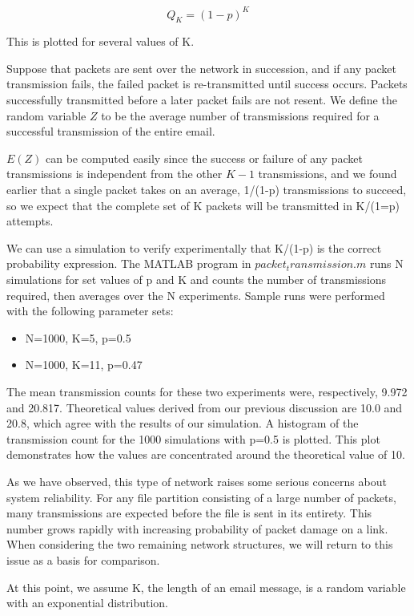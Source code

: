 \documentclass[10pt,twocolumn,letterpaper]{article}
\begin{document}
$$ Q_K = (1-p)^K $$

This is plotted for several values of K.

Suppose that packets are sent over the network in succession, and if any packet transmission fails, the failed packet is re-transmitted until success occurs. Packets successfully transmitted before a later packet fails are not resent. We define the random variable $Z$ to be the average number of transmissions required for a successful transmission of the entire email. 

$E(Z)$ can be computed easily since the success or failure of any packet transmissions is independent from the other $K-1$ transmissions, and we found earlier that a single packet takes on an average, 1/(1-p) transmissions to succeed, so we expect that the complete set of K packets will be transmitted in K/(1=p) attempts. 

We can use a simulation to verify experimentally that K/(1-p) is the correct probability expression. The MATLAB program in $packet_transmission.m$ runs N simulations for set values of p and K and counts the number of transmissions required, then averages over the N experiments. Sample runs were performed with the following parameter sets:

\begin{itemize}
    \item N=1000, K=5, p=0.5
    \item N=1000, K=11, p=0.47
\end{itemize}
 
 The mean transmission counts for these two experiments were, respectively, 9.972 and 20.817. Theoretical values derived from our previous discussion are 10.0 and 20.8, which agree with the results of our simulation. A histogram of the transmission count for the 1000 simulations with p=0.5 is plotted. This plot demonstrates how the values are concentrated around the theoretical value of 10.
 
 As we have observed, this type of network raises some serious concerns about system reliability. For any file partition consisting of a large number of packets, many transmissions are expected before the file is sent in its entirety. This number grows rapidly with increasing probability of packet damage on a link. When considering the two remaining network structures, we will return to this issue as a basis for comparison. 

At this point, we assume K, the length of an email message, is a random variable with an exponential distribution. 
\end{document}
